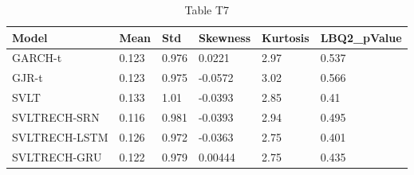 \begin{table}[htbp]
\centering
\caption{Table T7}
\label{tab:T7}
\begin{tabular}{llllll}
\toprule
Model & Mean & Std & Skewness & Kurtosis & LBQ2\_pValue \\
\midrule
GARCH-t & 0.123 & 0.976 & 0.0221 & 2.97 & 0.537 \\
GJR-t & 0.123 & 0.975 & -0.0572 & 3.02 & 0.566 \\
SVLT & 0.133 & 1.01 & -0.0393 & 2.85 & 0.41 \\
SVLTRECH-SRN & 0.116 & 0.981 & -0.0393 & 2.94 & 0.495 \\
SVLTRECH-LSTM & 0.126 & 0.972 & -0.0363 & 2.75 & 0.401 \\
SVLTRECH-GRU & 0.122 & 0.979 & 0.00444 & 2.75 & 0.435 \\
\bottomrule
\end{tabular}
\end{table}